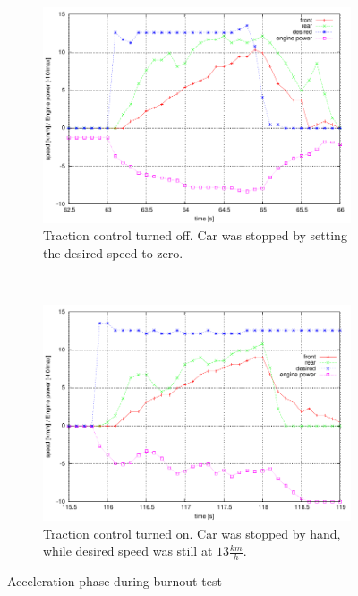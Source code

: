 \documentclass[a4paper
               ,10pt
               ,DIV=10 %
               ,BCOR=0.3cm
               ,pagesize %
               ,headings=small
               ,bibtotoc
               ]
               {scrartcl}
\begin{document}
\begin{figure}[H]
  \centering
  \begin{subfigure}[b]{0.5\textwidth}
    \centering
    \includegraphics[width=\textwidth]{pic/plot_burnout/plot.pdf}
    \caption{Traction control turned off. Car was stopped by setting the desired speed to zero.}
		\label{figand21}
  \end{subfigure}~
  \begin{subfigure}[b]{0.5\textwidth}
    \centering
    \includegraphics[width=\textwidth]{pic/plot_burnout_asr/plot.pdf}
    \caption{Traction control turned on. Car was stopped by hand, while desired speed was still at $13 \frac{km}{h}$.}
		\label{figand22}
  \end{subfigure}
  \caption{Acceleration phase during burnout test}
  \label{figblub22}
\end{figure}
\end{document}
